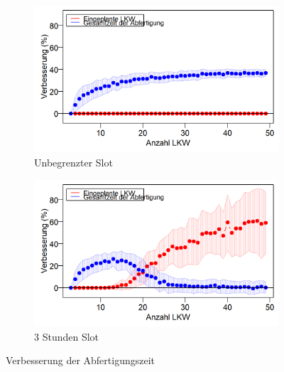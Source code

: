 

\begin{figure}[H]
\centering
\begin{subfigure}{.495\textwidth}
  \centering
  \includegraphics[width=\linewidth]{images/graphs/tspSimulatedAnnealingUnlimited.png}
  \caption{Unbegrenzter Slot}
  \label{fig:etspsimaopt2}
\end{subfigure}
\begin{subfigure}{.495\textwidth}
  \centering
  \includegraphics[width=\linewidth]{images/graphs/tspSimulatedAnnealingLimited.png}
  \caption{3 Stunden Slot}
  \label{fig:etspsimaopt2}
\end{subfigure}
\caption{Verbesserung der Abfertigungszeit}
\label{fig:evalTspSimAOpt}
\end{figure}


